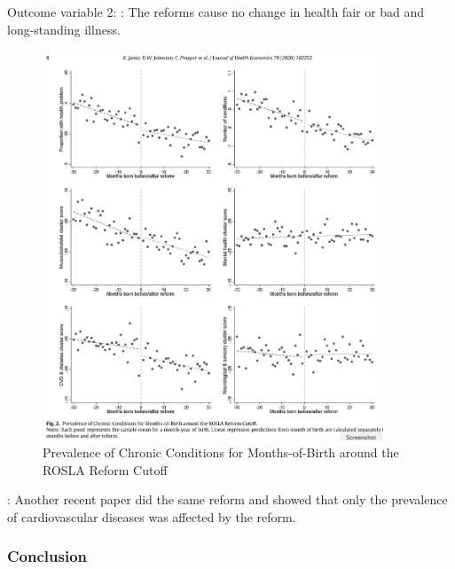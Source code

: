             Outcome variable 2: : The reforms cause no change in health fair or bad and long-standing illness.


            \begin{figure}[H]
                \centering
                \includegraphics[width=4in]{images/ch3/39.png}
                \caption{Prevalence of Chronic Conditions for Months-of-Birth around the ROSLA Reform Cutoff}
                \label{fig:rosla_plot}
            \end{figure} 

            : Another recent paper did the same reform and showed that only the prevalence of cardiovascular diseases was affected by the reform.

        \subsubsection{Conclusion}

